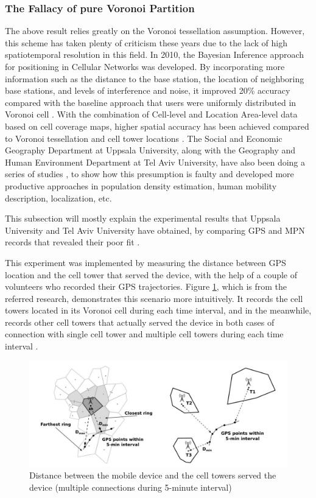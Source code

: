 \documentclass[12pt]{article}
\theoremstyle{definition}
\begin{document}
\subsubsection{The Fallacy of pure Voronoi Partition}
The above result relies greatly on the Voronoi tessellation assumption. However, this scheme has taken plenty of criticism these years due to the lack of high spatiotemporal resolution in this field. In 2010, the Bayesian Inference approach for positioning in Cellular Networks was developed. By incorporating more information such as the distance to the base station, the location of neighboring base stations, and levels of interference and noise, it improved 20\% accuracy compared with the baseline approach that users were uniformly distributed in Voronoi cell \cite{bayesian_inference_2010}. With the combination of Cell-level and Location Area-level data based on cell coverage maps, higher spatial accuracy has been achieved compared to Voronoi tessellation and cell tower locations \cite{interoperable_mpn_2016}. The Social and Economic Geography Department at Uppsala University, along with the Geography and Human Environment Department at Tel Aviv University, have also been doing a series of studies \cite{closest_antenna_fallacy_2021, prob_posit_mpn_2021}, to show how this presumption is faulty and developed more productive approaches in population density estimation, human mobility description, localization, etc.



This subsection will mostly explain the experimental results that Uppsala University and Tel Aviv University have obtained, by comparing GPS and MPN records that revealed their poor fit \cite{closest_antenna_fallacy_2021}. 


This experiment was implemented by measuring the distance between GPS location and the cell tower that served the device, with the help of a couple of volunteers who recorded their GPS trajectories. Figure \ref{fig:mc_connection}, which is from the referred research, demonstrates this scenario more intuitively. It records the cell towers located in its Voronoi cell during each time interval, and in the meanwhile, records other cell towers that actually served the device in both cases of connection with single cell tower and multiple cell towers during each time interval \cite{closest_antenna_fallacy_2021}.

\begin{figure}
  \centering
  \includegraphics[width=12cm]{mc_connection.png}
  \caption{Distance between the mobile device and the cell towers served the device (multiple connections during 5-minute interval) \cite{closest_antenna_fallacy_2021}}
  \label{fig:mc_connection}
\end{figure}
\end{document}
